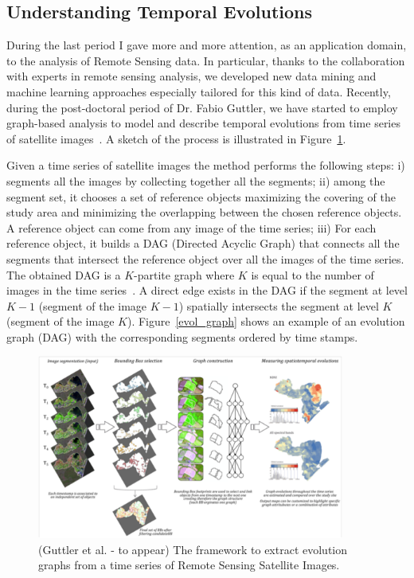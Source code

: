 \subsection{Understanding Temporal Evolutions}
During the last period I gave more and more attention, as an application domain, to the analysis of Remote Sensing data.
In particular, thanks to the collaboration with experts in remote sensing analysis, we developed new data mining and machine learning approaches especially tailored for this kind of data.
Recently, during the post-doctoral period of Dr. Fabio Guttler, we have started to employ graph-based analysis to model and describe temporal evolutions from time series of satellite images~\cite{GuttlerACINPT14,GuttlerITNP14}. A sketch of the process is illustrated in Figure~\ref{evol_bpa}. 

Given a time series of satellite images the method performs the following steps: i) segments all the images by collecting together all the segments; ii) among the segment set, it chooses a set of reference objects maximizing the covering of the study area and minimizing the overlapping between the chosen reference objects. A reference object can come from any image of the time series; iii) For each reference object, it builds a DAG (Directed Acyclic Graph) that connects all the segments that intersect the reference object over all the images of the time series. The obtained DAG is a $K$-partite graph where $K$ is equal to the number of images in the time series~\cite{GuttlerACINPT14}. A direct edge exists in the DAG if the segment at level $K-1$ (segment of the image $K-1$) spatially intersects the segment at level $K$ (segment of the image $K$). Figure~\ref{evol_graph} shows an example of an evolution graph (DAG) with the corresponding segments ordered by time stamps. 

\begin{figure}[!ht]
\begin{center}
	\includegraphics[width=0.90\textwidth]{Figures/evol_bpa.pdf}
\end{center}
\caption{\label{evol_bpa} (Guttler et al. - to appear) The framework to extract evolution graphs from a time series of Remote Sensing Satellite Images.}
\end{figure}

